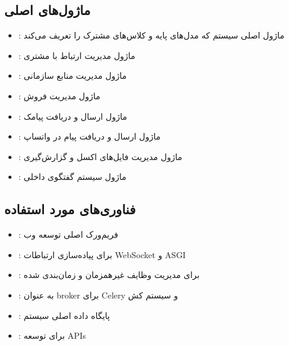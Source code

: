 \documentclass[letterpaper,10pt,english]{sphinxmanual}
\begin{document}
\subsection{ماژول‌های اصلی}
\label{\detokenize{architecture/index:id3}}\begin{itemize}
\item {} 
\sphinxAtStartPar
{}: ماژول اصلی سیستم که مدل‌های پایه و کلاس‌های مشترک را تعریف می‌کند

\item {} 
\sphinxAtStartPar
{}: ماژول مدیریت ارتباط با مشتری

\item {} 
\sphinxAtStartPar
{}: ماژول مدیریت منابع سازمانی

\item {} 
\sphinxAtStartPar
{}: ماژول مدیریت فروش

\item {} 
\sphinxAtStartPar
{}: ماژول ارسال و دریافت پیامک

\item {} 
\sphinxAtStartPar
{}: ماژول ارسال و دریافت پیام در واتساپ

\item {} 
\sphinxAtStartPar
{}: ماژول مدیریت فایل‌های اکسل و گزارش‌گیری

\item {} 
\sphinxAtStartPar
{}: ماژول سیستم گفتگوی داخلی

\end{itemize}


\subsection{فناوری‌های مورد استفاده}
\label{\detokenize{architecture/index:id4}}\begin{itemize}
\item {} 
\sphinxAtStartPar
{}: فریم‌ورک اصلی توسعه وب

\item {} 
\sphinxAtStartPar
{}: برای پیاده‌سازی ارتباطات WebSocket و ASGI

\item {} 
\sphinxAtStartPar
{}: برای مدیریت وظایف غیرهمزمان و زمان‌بندی شده

\item {} 
\sphinxAtStartPar
{}: به عنوان broker برای Celery و سیستم کش

\item {} 
\sphinxAtStartPar
{}: پایگاه داده اصلی سیستم

\item {} 
\sphinxAtStartPar
{}: برای توسعه APIs

\end{itemize}
\end{document}
